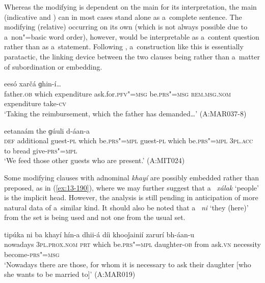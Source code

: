 Whereas the modifying  is dependent on the main  for its interpretation, the main (indicative and )  can in most cases stand alone as a~complete sentence. The modifying (relative)  occurring on its own (which is not always possible due to a~non"=basic word order), however, would be interpretable as a~content question rather than as a~statement. Following \citet[182]{givon2001b}, a~construction like this is essentially paratactic, the linking device between the two clauses being  rather than a~matter of subordination or embedding.

\begin{exe}
\ex
\label{ex:13-188}
  eesó xarčá ɡhin-í{\ldots}  \\
father.\textsc{ob} which expenditure ask.for.\textsc{pfv"=msg} be.\textsc{prs"=msg} \textsc{rem.msg.nom} expenditure take-\textsc{cv} \\
\glt `Taking the reimbursement, which the father has demanded{\ldots}' (A:MAR037-8)

\ex
\label{ex:13-189}
eetanaám the ɡúuli d-áan-a \\
\textsc{def} additional guest-\textsc{pl} which be.\textsc{prs"=mpl} guest-\textsc{pl} which be.\textsc{prs"=mpl} \textsc{3pl.acc} to bread give-\textsc{prs"=mpl} \\
\glt `We feed those other guests who are present.' (A:MIT024) 
\end{exe}

Some modifying clauses with adnominal \textit{khayí} are possibly embedded rather than preposed, as in (\ref{ex:13-190}), where we may further suggest that a~ \textit{xálak} `people' is the implicit head. However, the analysis is still pending in anticipation of more natural data of a~similar kind. It should also be noted that a~ \textit{ni} `they (here)' from the  set is being used and not one from the usual  set.

\begin{exe}
\ex
\label{ex:13-190}
\gll tipúka ni ba khayí hín-a  dhii-á díi khooǰainií zarurí bh-áan-u \\
nowadays \textsc{3pl.prox.nom} \textsc{prt} which be.\textsc{prs"=mpl}  daughter-\textsc{ob} from ask.\textsc{vn} necessity become-\textsc{prs"=msg} \\
\glt `Nowadays there are those, for whom it is necessary to ask their daughter [who she wants to be married to]' (A:MAR019) 
\end{exe}

